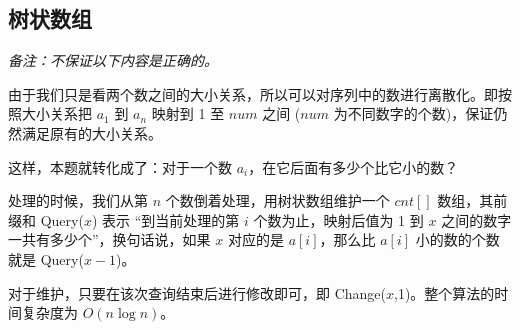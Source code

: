 \subsection{树状数组}
	\emph{备注：不保证以下内容是正确的。}

	由于我们只是看两个数之间的大小关系，所以可以对序列中的数进行离散化。即按照大小关系把 $a_1$ 到 $a_n$ 映射到 1 至 $num$ 之间 ($num$ 为不同数字的个数)，保证仍然满足原有的大小关系。
	
	这样，本题就转化成了：对于一个数 $a_i$，在它后面有多少个比它小的数？
	
	处理的时候，我们从第 $n$ 个数倒着处理，用树状数组维护一个 $cnt[]$ 数组，其前缀和 Query($x$) 表示 “到当前处理的第 $i$ 个数为止，映射后值为 1 到 $x$ 之间的数字一共有多少个”，换句话说，如果 $x$ 对应的是 $a[i]$，那么比 $a[i]$ 小的数的个数就是 Query($x-1$)。
	
	对于维护，只要在该次查询结束后进行修改即可，即 Change($x$,1)。整个算法的时间复杂度为 $O(n\log n)$。
	
	